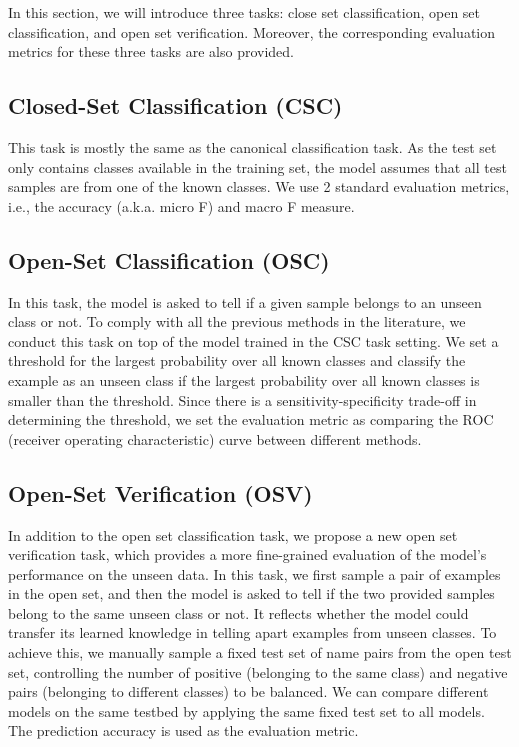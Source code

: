 \documentclass{article}
\begin{document}
In this section, we will introduce three tasks: close set classification, open set classification, and open set verification. Moreover, the corresponding evaluation metrics for these three tasks are also provided. 

\subsection{Closed-Set Classification (CSC)} \label{csc}
This task is mostly the same as the canonical classification task. As the test set only contains classes available in the training set, the model assumes that all test samples are from one of the known classes. We use 2 standard evaluation metrics, i.e., the accuracy (a.k.a. micro F) and macro F measure. 

\subsection{Open-Set Classification (OSC)} \label{osc}
In this task, the model is asked to tell if a given sample belongs to an unseen class or not. To comply with all the previous methods in the literature, we conduct this task on top of the model trained in the CSC task setting. We set a threshold for the largest probability over all known classes and classify the example as an unseen class if the largest probability over all known classes is smaller than the threshold.
Since there is a sensitivity-specificity trade-off in determining the threshold, we set the evaluation metric as comparing the ROC (receiver operating characteristic) curve between different methods. 

\subsection{Open-Set Verification (OSV)} \label{osv}
In addition to the open set classification task, we propose a new open set verification task, which provides a more fine-grained evaluation of the model's performance on the unseen data. In this task, we first sample a pair of examples in the open set, and then the model is asked to tell if the two provided samples belong to the same unseen class or not. It reflects whether the model could transfer its learned knowledge in telling apart examples from unseen classes.  
To achieve this, we manually sample a fixed test set of name pairs from the open test set, controlling the number of positive (belonging to the same class) and negative pairs (belonging to different classes) to be balanced. We can compare different models on the same testbed by applying the same fixed test set to all models. The prediction accuracy is used as the evaluation metric.
\end{document}
